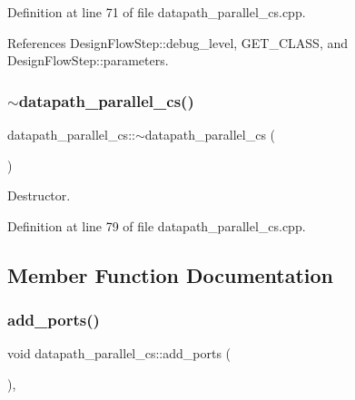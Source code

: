 Definition at line 71 of file datapath\+\_\+parallel\+\_\+cs.\+cpp.



References Design\+Flow\+Step\+::debug\+\_\+level, G\+E\+T\+\_\+\+C\+L\+A\+SS, and Design\+Flow\+Step\+::parameters.

\mbox{\label{classdatapath__parallel__cs_a6af0c1233e253a225e37aa2f1677524b}} 
\subsubsection{\texorpdfstring{$\sim$datapath\+\_\+parallel\+\_\+cs()}{~datapath\_parallel\_cs()}}
{\footnotesize\ttfamily datapath\+\_\+parallel\+\_\+cs\+::$\sim$datapath\+\_\+parallel\+\_\+cs (\begin{DoxyParamCaption}{ }\end{DoxyParamCaption})\hspace{0.3cm}{\ttfamily [virtual]}}



Destructor. 



Definition at line 79 of file datapath\+\_\+parallel\+\_\+cs.\+cpp.



\subsection{Member Function Documentation}
\mbox{\label{classdatapath__parallel__cs_af4ae83a9ee67fb9c5f2cdc6f7f5678a4}} 
\subsubsection{\texorpdfstring{add\+\_\+ports()}{add\_ports()}}
{\footnotesize\ttfamily void datapath\+\_\+parallel\+\_\+cs\+::add\+\_\+ports (\begin{DoxyParamCaption}{ }\end{DoxyParamCaption})\hspace{0.3cm}{\ttfamily [protected]}, {\ttfamily [virtual]}}



